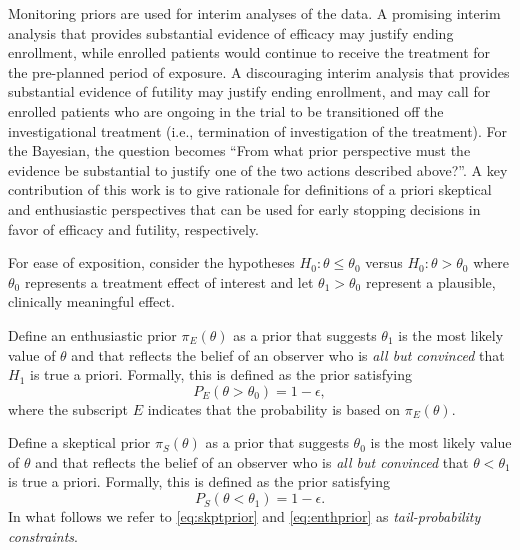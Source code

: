 \documentclass[useAMS,usenatbib,referee]{biom}
\begin{document}
Monitoring priors are used for interim analyses of the data. 
A promising interim analysis that provides substantial evidence of efficacy may justify ending enrollment, while enrolled patients would continue 
to receive the treatment for the pre-planned period of exposure. 
%
A discouraging interim analysis that provides substantial evidence of futility may justify ending enrollment, and may call for enrolled patients 
who are ongoing in the trial to be transitioned off the investigational treatment (i.e., termination of investigation of the treatment). 
%
For the Bayesian, the question becomes ``From what prior perspective must the evidence be substantial to justify one of the two actions described above?''.
%
A key contribution of this work is to give rationale for definitions of a priori skeptical and enthusiastic perspectives that can be used for early stopping decisions 
in favor of efficacy and futility, respectively.


For ease of exposition, consider the hypotheses $H_0: \theta \le \theta_0$ versus $H_0: \theta > \theta_0$ where $\theta_0$ represents a treatment effect of interest and let $\theta_1>\theta_0$ 
represent a plausible, clinically meaningful effect.

Define an enthusiastic prior $\pi_{E}(\theta)$ as a prior that suggests $\theta_1$ is the most likely value of $\theta$ 
and that reflects the belief of an observer who is \textit{all but convinced} that $H_1$ is true a priori. 
%
Formally, this is defined as the prior satisfying
\begin{equation}\label{eq:skptprior}
P_E(\theta >\theta_0)=1-\epsilon,
\end{equation}
where the subscript $E$ indicates that the probability is based on $\pi_{E}(\theta)$.

Define a skeptical prior $\pi_{S}(\theta)$ as a prior that suggests $\theta_0$ is the most likely value of $\theta$ 
and that reflects the belief of an observer who is \textit{all but convinced} that $\theta <\theta_1$ is true a priori. 
%
Formally, this is defined as the prior satisfying
\begin{equation}\label{eq:enthprior}
P_S(\theta <\theta_1)=1-\epsilon.
\end{equation}
%
In what follows we refer to \eqref{eq:skptprior} and \eqref{eq:enthprior} as \textit{tail-probability constraints}.
\end{document}
